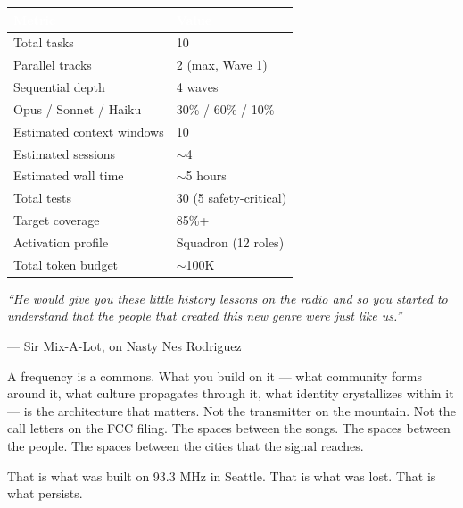\documentclass[11pt,letterpaper]{article}
\newcommand{\tableheader}[1]{\textbf{\sffamily\textcolor{white}{#1}}}
\begin{document}
\begin{center}
\begin{tabularx}{\textwidth}{L{4cm}X}
\toprule
{}
\tableheader{Metric} & \tableheader{Value} \\
\midrule
Total tasks & 10 \\
Parallel tracks & 2 (max, Wave 1) \\
Sequential depth & 4 waves \\
Opus / Sonnet / Haiku & 30\% / 60\% / 10\% \\
Estimated context windows & 10 \\
Estimated sessions & $\sim$4 \\
Estimated wall time & $\sim$5 hours \\
Total tests & 30 (5 safety-critical) \\
Target coverage & 85\%+ \\
Activation profile & Squadron (12 roles) \\
Total token budget & $\sim$100K \\
\bottomrule
\end{tabularx}
\end{center}

\vspace{1em}

\begin{quotebox}
\textit{``He would give you these little history lessons on the radio and so you started to understand that the people that created this new genre were just like us.''}

\vspace{0.5em}

--- Sir Mix-A-Lot, on Nasty Nes Rodriguez

\vspace{0.5em}

A frequency is a commons. What you build on it --- what community forms around it, what culture propagates through it, what identity crystallizes within it --- is the architecture that matters. Not the transmitter on the mountain. Not the call letters on the FCC filing. The spaces between the songs. The spaces between the people. The spaces between the cities that the signal reaches.

That is what was built on 93.3 MHz in Seattle. That is what was lost. That is what persists.
\end{quotebox}
\end{document}
